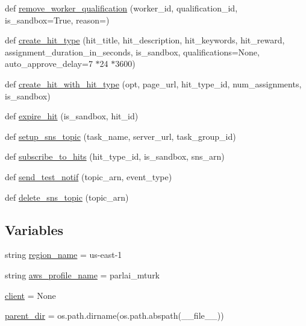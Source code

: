 \begin{DoxyCompactItemize}
\item 
def \hyperlink{namespaceparlai_1_1mturk_1_1core_1_1mturk__utils_a9221bb896f04cca6c0acac4bc127fdbf}{remove\+\_\+worker\+\_\+qualification} (worker\+\_\+id, qualification\+\_\+id, is\+\_\+sandbox=True, reason=\textquotesingle{}\textquotesingle{})
\item 
def \hyperlink{namespaceparlai_1_1mturk_1_1core_1_1mturk__utils_a2812666cca37ae0fa15e1843d3a87cd4}{create\+\_\+hit\+\_\+type} (hit\+\_\+title, hit\+\_\+description, hit\+\_\+keywords, hit\+\_\+reward, assignment\+\_\+duration\+\_\+in\+\_\+seconds, is\+\_\+sandbox, qualifications=None, auto\+\_\+approve\+\_\+delay=7 $\ast$24 $\ast$3600)
\item 
def \hyperlink{namespaceparlai_1_1mturk_1_1core_1_1mturk__utils_a2e92dde4f8ec17749f22f83b6d362d4f}{create\+\_\+hit\+\_\+with\+\_\+hit\+\_\+type} (opt, page\+\_\+url, hit\+\_\+type\+\_\+id, num\+\_\+assignments, is\+\_\+sandbox)
\item 
def \hyperlink{namespaceparlai_1_1mturk_1_1core_1_1mturk__utils_a960c8639f5fa43ab8be109eb48ea1925}{expire\+\_\+hit} (is\+\_\+sandbox, hit\+\_\+id)
\item 
def \hyperlink{namespaceparlai_1_1mturk_1_1core_1_1mturk__utils_a98c01409407393818d100c21a4e07742}{setup\+\_\+sns\+\_\+topic} (task\+\_\+name, server\+\_\+url, task\+\_\+group\+\_\+id)
\item 
def \hyperlink{namespaceparlai_1_1mturk_1_1core_1_1mturk__utils_accc5838e30ccf9ab95050ab11ac0d973}{subscribe\+\_\+to\+\_\+hits} (hit\+\_\+type\+\_\+id, is\+\_\+sandbox, sns\+\_\+arn)
\item 
def \hyperlink{namespaceparlai_1_1mturk_1_1core_1_1mturk__utils_a03b8f25675cb76e8b27205ca5d26e623}{send\+\_\+test\+\_\+notif} (topic\+\_\+arn, event\+\_\+type)
\item 
def \hyperlink{namespaceparlai_1_1mturk_1_1core_1_1mturk__utils_a669fa20824749469221df338aa8a0e8e}{delete\+\_\+sns\+\_\+topic} (topic\+\_\+arn)
\end{DoxyCompactItemize}
\subsection*{Variables}
\begin{DoxyCompactItemize}
\item 
string \hyperlink{namespaceparlai_1_1mturk_1_1core_1_1mturk__utils_aee608122885844b570d86be9f0a5d731}{region\+\_\+name} = \textquotesingle{}us-\/east-\/1\textquotesingle{}
\item 
string \hyperlink{namespaceparlai_1_1mturk_1_1core_1_1mturk__utils_acb7b9577d828e5c693ca1c20069c5d14}{aws\+\_\+profile\+\_\+name} = \textquotesingle{}parlai\+\_\+mturk\textquotesingle{}
\item 
\hyperlink{namespaceparlai_1_1mturk_1_1core_1_1mturk__utils_a46a5a1362c84f2ab158459d11e5ff75b}{client} = None
\item 
\hyperlink{namespaceparlai_1_1mturk_1_1core_1_1mturk__utils_a707afd86b31fd970b726f481d15f570a}{parent\+\_\+dir} = os.\+path.\+dirname(os.\+path.\+abspath(\+\_\+\+\_\+file\+\_\+\+\_\+))
\end{DoxyCompactItemize}


